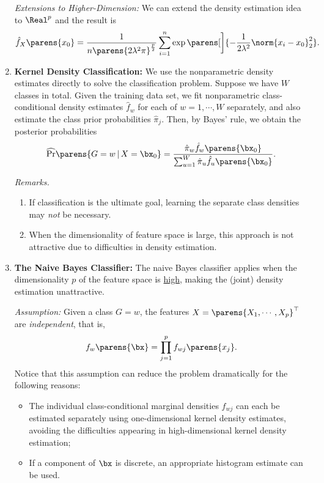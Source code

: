 \documentclass[12pt]{article}
\begin{document}
\begin{enumerate}[label=\textbf{\arabic*.}]
	\textit{Extensions to Higher-Dimension:} We can extend the density estimation idea to $\Real^p$ and the result is 
	\begin{align*}
		\hat{f}_X \parens{x_0} = \frac{1}{n \parens{2 \lambda^2 \pi}^{\frac{p}{2}}} \sum_{i=1}^n \exp \parens[\bigg]{-\frac{1}{2 \lambda^2} \norm{x_i - x_0}_2^2}. 
	\end{align*}
	
	\item \textbf{Kernel Density Classification:} We use the nonparametric density estimates directly to solve the classification problem. Suppose we have $W$ classes in total. Given the training data set, we fit nonparametric class-conditional density estimates $\hat{f}_w$ for each of $w = 1, \cdots, W$ separately, and also estimate the class prior probabilities $\hat{\pi}_j$. Then, by Bayes' rule, we obtain the posterior probabilities 
	\begin{align*}
		\widehat{\Pr} \parens{G = w \,\vert\, X = \bx_0} = \frac{\hat{\pi}_w \hat{f}_w \parens{\bx_0}}{\sum_{u=1}^W \hat{\pi}_u \hat{f}_u \parens{\bx_0}}. 
	\end{align*}
	
	\textit{Remarks.} 
	\begin{enumerate}
		\item If classification is the ultimate goal, learning the separate class densities may \emph{not} be necessary. 
		\item When the dimensionality of feature space is large, this approach is not attractive due to difficulties in density estimation. 
	\end{enumerate}
	
	\item \textbf{The Naive Bayes Classifier:} The naive Bayes classifier applies when the dimensionality $p$ of the feature space is \underline{high}, making the (joint) density estimation unattractive. 
	
	\textit{Assumption:} Given a class $G = w$, the features $X = \parens{X_1, \cdots, X_p}^\top$ are \emph{independent}, that is, 
	\begin{align*}
		f_w \parens{\bx} = \prod_{j=1}^p f_{wj} \parens{x_j}. 
	\end{align*}
	Notice that this assumption can reduce the problem dramatically for the following reasons: 
	\begin{itemize}
		\item The individual class-conditional marginal densities $f_{wj}$ can each be estimated separately using one-dimensional kernel density estimates, avoiding the difficulties appearing in high-dimensional kernel density estimation; 
		\item If a component of $\bx$ is discrete, an appropriate histogram estimate can be used. 
	\end{itemize}
	

\end{enumerate}
\end{document}
